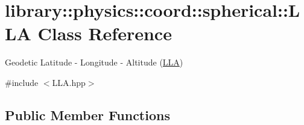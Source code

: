 \hypertarget{classlibrary_1_1physics_1_1coord_1_1spherical_1_1_l_l_a}{}\section{library\+:\+:physics\+:\+:coord\+:\+:spherical\+:\+:L\+LA Class Reference}
\label{classlibrary_1_1physics_1_1coord_1_1spherical_1_1_l_l_a}


Geodetic Latitude -\/ Longitude -\/ Altitude (\hyperlink{classlibrary_1_1physics_1_1coord_1_1spherical_1_1_l_l_a}{L\+LA})  




{\ttfamily \#include $<$L\+L\+A.\+hpp$>$}

\subsection*{Public Member Functions}
